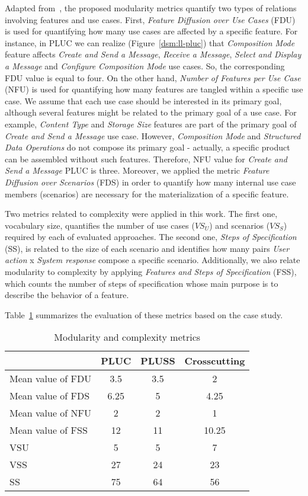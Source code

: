 \documentclass{acm_proc_article-sp}
\begin{document}
Adapted from~\cite{greenwood-ecoop-2007}, the proposed modularity metrics quantify two types of 
relations involving features and use cases. First, \emph{Feature Diffusion over Use Cases} (FDU)
is used for quantifying how many use cases are affected by a specific feature. For instance, in PLUC we 
can realize (Figure~\ref{dsm:ll-pluc}) that \emph{Composition Mode} feature affects \emph{Create and Send a Message}, 
\emph{Receive a Message}, \emph{Select and Display a Message} and \emph{Configure Composition Mode} use cases. So, the 
corresponding FDU value is equal to four. On the other hand, \emph{Number of Features per Use Case} (NFU)
is used for quantifying how many features are tangled within a specific use case. We assume that each use 
case should be interested in its primary goal, although several features might be related to the primary goal of a use case.
For example, \emph{Content Type} and \emph{Storage Size} features are part of the primary goal of \emph{Create and Send a
Message} use case. However, \emph{Composition Mode} and \emph{Structured Data Operations} do not compose
its primary goal - actually, a specific product can be assembled without such features. 
Therefore, NFU value for \emph{Create and Send a Message} PLUC is three. Moreover, 
we applied the metric \emph{Feature Diffusion over Scenarios} (FDS) in order 
to quantify how many internal use case members (scenarios) are necessary for the materialization of a specific feature.

Two metrics related to complexity were applied in this work. The first one, vocabulary size,
quantifies the number of use cases ($VS_{U}$) and scenarios ($VS_{S}$) required by each of evaluated
approaches. The second one, \emph{Steps of Specification} (SS), is related to the size of each 
scenario and identifies how many pairs \emph{User action} x \emph{System response} compose a specific scenario. 
Additionally, we also relate modularity to complexity by applying \emph{Features and Steps of Specification} (FSS), which counts the number of steps of specification whose main purpose is to describe the behavior of a feature. 

Table~\ref{tab:metrics} summarizes the evaluation of these metrics based on the case study.

\begin{table}[hb]
\centering
\caption{Modularity and complexity metrics}
\label{tab:metrics}
\begin{tabular}{lccc} \hline
					& PLUC 	& PLUSS 	& Crosscutting	\\ \hline
Mean value of FDU 		& 3.5	& 3.5	& 2		\\
Mean value of FDS 		& 6.25	& 5		& 4.25	\\
Mean value of NFU 		& 2		& 2		& 1		\\
Mean value of FSS 		&12		& 11		& 10.25	\\ 
VSU 					& 5		& 5		& 7		\\
VSS 					& 27		& 24		& 23		\\
SS 					& 75		& 64		& 56		\\	\hline
\end{tabular}
\end{table}
\end{document}
